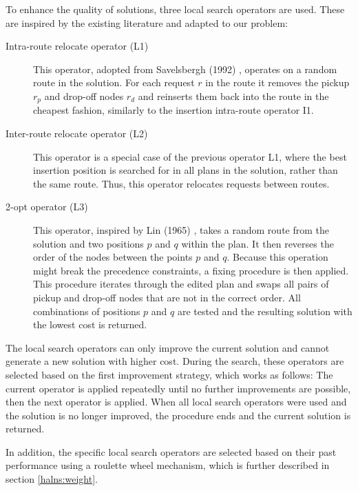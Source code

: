    To enhance the quality of solutions, three local search operators are used. These are inspired by the existing literature and adapted to our problem:
    
    \begin{description}
    		
    		\item [Intra-route relocate operator (L1)] This operator, adopted from Savelsbergh (1992) \cite{Savelsbergh1992}, operates on a random route in the solution. For each request $r$ in the route it removes the pickup $r_p$ and drop-off nodes $r_d$ and reinserts them back into the route in the cheapest fashion, similarly to the insertion intra-route operator I1.
    		
    		\item [Inter-route relocate operator (L2)] This operator is a special case of the previous operator L1, where the best insertion position is searched for in all plans in the solution, rather than the same route. Thus, this operator relocates requests between routes.
    		
    		\item [2-opt operator (L3)] This operator, inspired by Lin (1965) \cite{Lin1965}, takes a random route from the solution and two positions $p$ and $q$ within the plan. It then reverses the order of the nodes between the points $p$ and $q$. Because this operation might break the precedence constraints, a fixing procedure is then applied. This procedure iterates through the edited plan and swaps all pairs of pickup and drop-off nodes that are not in the correct order. All combinations of positions $p$ and $q$ are tested and the resulting solution with the lowest cost is returned.
    		
    \end{description}
    
    The local search operators can only improve the current solution and cannot generate a new solution with higher cost. During the search, these operators are selected based on the first improvement strategy, which works as follows: The current operator is applied repeatedly until no further improvements are possible, then the next operator is applied. When all local search operators were used and the solution is no longer improved, the procedure ends and the current solution is returned.
    
    In addition, the specific local search operators are selected based on their past performance using a roulette wheel mechanism, which is further described in section \ref{halns:weight}.
    

